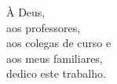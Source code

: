 \pretextualchapter{}

\vspace{8cm}

\begin{flushright}
\hfill \textnormal{
À Deus, \\
aos professores, \\
aos colegas de curso e \\
aos meus familiares, \\
dedico este trabalho.}
\end{flushright}
